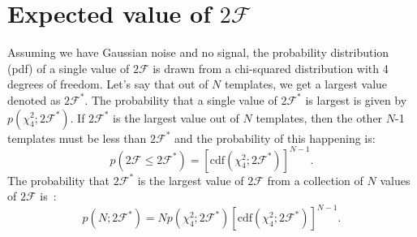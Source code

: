 \documentclass{ttuthes2007}
\begin{document}
\section{Expected value of $2\mathcal{F}$}
Assuming we have Gaussian noise and no signal, the probability distribution
(pdf) of a single value of $2\mathcal{F}$ is drawn from a chi-squared
distribution with 4 degrees of freedom.  Let's say that out of $N$ templates, we
get a largest value denoted as $2\mathcal{F}^*$. The probability that a single
value of $2\mathcal{F}^*$ is largest is given by $p(\chi^2_4;2\mathcal{F}^*)$.
If $2\mathcal{F}^*$ is the largest value out of $N$ templates, then the other
$N$-1 templates must be less than $2\mathcal{F}^*$ and the probability of this
happening is:
\begin{equation}
p(2\mathcal{F}\leq2\mathcal{F}^*)=
[\mathrm{cdf}(\chi^2_4;2\mathcal{F}^*)]^{N-1}.
\end{equation} 
The probability that $2\mathcal{F}^*$ is the largest value of $2\mathcal{F}$
from a collection of $N$ values of $2\mathcal{F}$ is~\cite{Abadie_2010, Wette:2009uea}:
\begin{equation}                                                                
p(N;2\mathcal{F}^*)=
Np(\chi^2_4;2\mathcal{F}^*)[\mathrm{cdf}(\chi^2_4;2\mathcal{F}^*)]^{N-1}. 
\end{equation}
\end{document}
